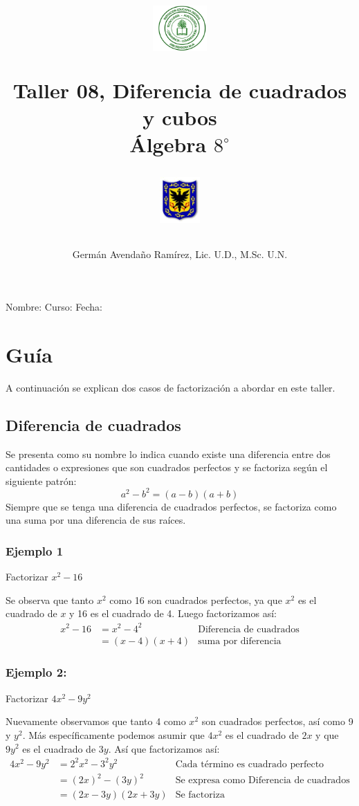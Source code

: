 \documentclass[10pt,twoside]{article}
\author{Germ\'an Avenda\~no Ram\'irez, Lic. U.D., M.Sc. U.N.}
\title{\begin{minipage}{.2\textwidth}
\includegraphics[height=1.75cm]{Images/logo-colegio.png}\end{minipage}
\begin{minipage}{.55\textwidth}
\begin{center}
Taller 08, Diferencia de cuadrados y cubos\\
Álgebra $8^{\circ}$
\end{center}
\end{minipage}\hfill
\begin{minipage}{.2\textwidth}
\includegraphics[height=1.75cm]{Images/logo-sed.png} 
\end{minipage}}
\date{}
\begin{document}
\maketitle
Nombre: \hrulefill Curso: \underline{\hspace*{44pt}} Fecha: \underline{\hspace*{2.5cm}}
\section*{Gu\'{i}a}
A continuaci\'{o}n se explican dos casos de factorizaci\'{o}n a abordar en este taller.
\subsection*{Diferencia de cuadrados}
Se presenta como su nombre lo indica cuando existe una diferencia entre dos cantidades o expresiones que son cuadrados perfectos y se factoriza seg\'{u}n el siguiente patr\'{o}n:
\[a^{2}-b^{2}=(a-b)(a+b)\]
Siempre que se tenga una diferencia de cuadrados perfectos, se factoriza como una suma por una diferencia de sus ra\'{i}ces.
\subsubsection*{Ejemplo 1}
Factorizar $x^{2}-16$

Se observa que tanto $x^{2}$ como 16 son cuadrados perfectos, ya que $x^{2}$ es el cuadrado de $x$ y 16 es el cuadrado de 4. Luego factorizamos as\'{i}:
\begin{align*}
x^{2}-16&=x^{2}-4^{2} & \mbox{Diferencia de cuadrados}\\
&=(x-4)(x+4) & \mbox{suma por diferencia}
\end{align*}
\subsubsection*{Ejemplo 2:}
Factorizar $4x^{2}-9y^{2}$

Nuevamente observamos que tanto 4 como $x^{2}$ son cuadrados perfectos, as\'{i} como 9 y $y^{2}$. M\'{a}s espec\'{i}ficamente podemos asumir que $4x^{2}$ es el cuadrado de $2x$ y que $9y^{2}$ es el cuadrado de $3y$. As\'{i} que factorizamos as\'{i}:
\begin{align*}
4x^{2}-9y^{2}&=2^{2}x^{2}-3^{2}y^{2} & \mbox{Cada término es cuadrado perfecto}\\
&=(2x)^{2}-(3y)^{2}& \mbox{Se expresa como Diferencia de cuadrados}\\
&=(2x-3y)(2x+3y) & \mbox{Se factoriza}
\end{align*}
\end{document}
